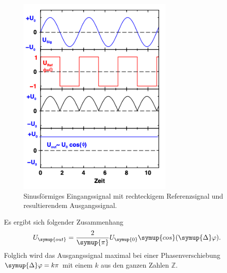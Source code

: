 \begin{figure} [H]
    \centering
    \includegraphics[height=10cm]{content/Bilder/Signalverlaeufe.png}
    \caption{Sinusförmiges Eingangssignal mit rechteckigem Referenzsignal und resultierendem %
    Ausgangssignal.\cite{v303}}
    \label{fig:Signalverlaeufe}
\end{figure}

Es ergibt sich folgender Zusammenhang
\begin{equation}
    U_{\symup{out}} = \frac{2}{\symup{\pi}}U_{\symup{0}}\symup{cos}(\symup{\Delta}\varphi).
    \label{eq:Ausgangssignal Proportionalitaet}
\end{equation}
Folglich wird das Ausgangssignal maximal bei einer Phasenverschiebung $\symup{\Delta}\varphi = k\pi$ mit einem $k$ aus den ganzen
Zahlen $\mathbb{Z}$.
